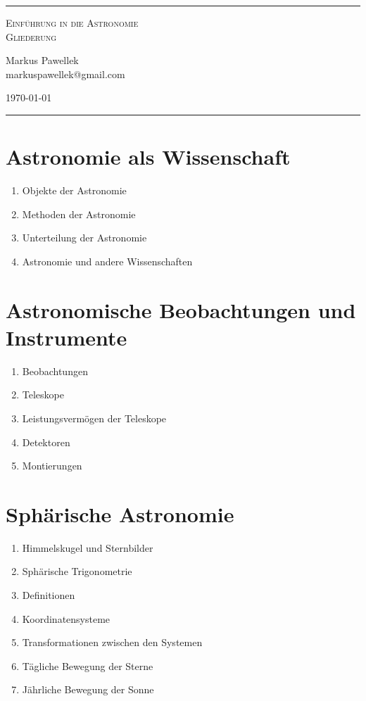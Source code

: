 \documentclass[a4paper,9pt]{article}
\begin{document}
  \hrule
  \begin{center}
    \scshape
    \huge
    Einführung in die Astronomie \\[\baselineskip]
    Gliederung \\ [\baselineskip]
    \normalfont
    \normalsize
    \begin{minipage}[c]{0.49\textwidth}
      Markus Pawellek \\[\baselineskip]
      markuspawellek@gmail.com
    \end{minipage}
    \hfill
    \today
  \end{center}
  \hrule
  \bigskip
  \begin{multicols}{3}
    \section{Astronomie als Wissenschaft} %
    \label{sec:astronomie_als_wissenschaft}
      \begin{enumerate}
        \item Objekte der Astronomie
        \item Methoden der Astronomie
        \item Unterteilung der Astronomie
        \item Astronomie und andere Wissenschaften
      \end{enumerate}

    \section{Astronomische Beobachtungen und Instrumente} %
    \label{sec:astronomische_beobachtungen_und_instrumente}
      \begin{enumerate}
        \item Beobachtungen
        \item Teleskope
        \item Leistungsvermögen der Teleskope
        \item Detektoren
        \item Montierungen
      \end{enumerate}

    \section{Sphärische Astronomie} %
    \label{sec:sphärische_astronomie}
      \begin{enumerate}
        \item Himmelskugel und Sternbilder
        \item Sphärische Trigonometrie
        \item Definitionen
        \item Koordinatensysteme
        \item Transformationen zwischen den Systemen
        \item Tägliche Bewegung der Sterne
        \item Jährliche Bewegung der Sonne
      \end{enumerate}


\end{multicols}
\end{document}
